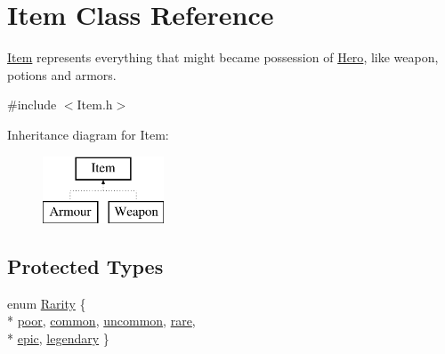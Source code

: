 \hypertarget{class_item}{}\section{Item Class Reference}
\label{class_item}


\hyperlink{class_item}{Item} represents everything that might became possession of \hyperlink{class_hero}{Hero}, like weapon, potions and armors.  




{\ttfamily \#include $<$Item.\+h$>$}

Inheritance diagram for Item\+:\begin{figure}[H]
\begin{center}
\leavevmode
\includegraphics[height=2.000000cm]{class_item}
\end{center}
\end{figure}
\subsection*{Protected Types}
\begin{DoxyCompactItemize}
\item 
enum \hyperlink{class_item_ab29041c9ccfd11419abe6f39ac90bb6a}{Rarity} \{ \\*
\hyperlink{class_item_ab29041c9ccfd11419abe6f39ac90bb6aa6c9a50ca47b7a35469e9ba7feafe0c02}{poor}, 
\hyperlink{class_item_ab29041c9ccfd11419abe6f39ac90bb6aa500ded4262e0d28d13fa893e29e4663c}{common}, 
\hyperlink{class_item_ab29041c9ccfd11419abe6f39ac90bb6aa8f0fcc9917f33df2de8d655460e28e9f}{uncommon}, 
\hyperlink{class_item_ab29041c9ccfd11419abe6f39ac90bb6aa129fb8ce09940319e8cb9a83d76224d6}{rare}, 
\\*
\hyperlink{class_item_ab29041c9ccfd11419abe6f39ac90bb6aa673dee240d5464c9281f768c1699258b}{epic}, 
\hyperlink{class_item_ab29041c9ccfd11419abe6f39ac90bb6aaacb632a48a05151530bce1df85b0fdbb}{legendary}
 \}
\end{DoxyCompactItemize}
